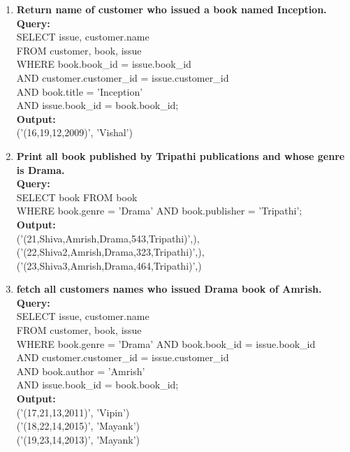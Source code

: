 \begin{enumerate}
\item \textbf{Return name of customer who issued a book named Inception.}\\
\textbf{Query:}\\SELECT issue, customer.name\\
FROM customer, book, issue\\
WHERE book.book\_id = issue.book\_id\\ 
AND customer.customer\_id = issue.customer\_id\\ 
AND book.title = 'Inception' \\
AND issue.book\_id = book.book\_id;\\
\textbf{Output:}\\ ('(16,19,12,2009)', 'Vishal')

\item \textbf{Print all book published by Tripathi publications and whose genre is Drama.}\\
\textbf{Query:}\\SELECT book FROM book \\
WHERE book.genre = 'Drama' AND book.publisher = 'Tripathi';\\
\textbf{Output:}\\
('(21,Shiva,Amrish,Drama,543,Tripathi)',),\\
('(22,Shiva2,Amrish,Drama,323,Tripathi)',),\\
('(23,Shiva3,Amrish,Drama,464,Tripathi)',)

\item \textbf{fetch all customers names  who issued Drama book of Amrish.}\\
\textbf{Query:}\\SELECT issue, customer.name \\
FROM customer, book, issue\\
WHERE book.genre = 'Drama' AND book.book\_id = issue.book\_id \\
AND customer.customer\_id = issue.customer\_id \\
AND book.author = 'Amrish' \\
AND issue.book\_id = book.book\_id;\\
\textbf{Output:}\\
('(17,21,13,2011)', 'Vipin')\\
('(18,22,14,2015)', 'Mayank')\\
('(19,23,14,2013)', 'Mayank')\\


\end{enumerate}
